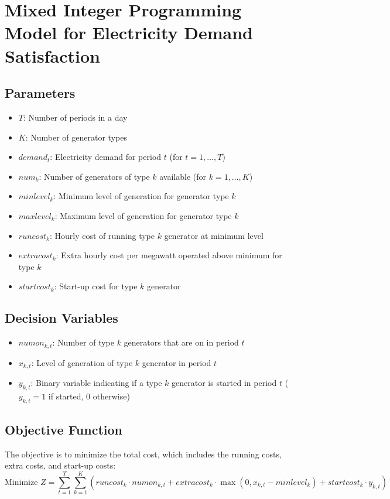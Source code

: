 \documentclass{article}
\begin{document}
\section*{Mixed Integer Programming Model for Electricity Demand Satisfaction}

\subsection*{Parameters}
\begin{itemize}
    \item $T$: Number of periods in a day
    \item $K$: Number of generator types
    \item $demand_{t}$: Electricity demand for period $t$ (for $t = 1, \ldots, T$)
    \item $num_{k}$: Number of generators of type $k$ available (for $k = 1, \ldots, K$)
    \item $minlevel_{k}$: Minimum level of generation for generator type $k$
    \item $maxlevel_{k}$: Maximum level of generation for generator type $k$
    \item $runcost_{k}$: Hourly cost of running type $k$ generator at minimum level
    \item $extracost_{k}$: Extra hourly cost per megawatt operated above minimum for type $k$
    \item $startcost_{k}$: Start-up cost for type $k$ generator
\end{itemize}

\subsection*{Decision Variables}
\begin{itemize}
    \item $numon_{k, t}$: Number of type $k$ generators that are on in period $t$
    \item $x_{k, t}$: Level of generation of type $k$ generator in period $t$
    \item $y_{k, t}$: Binary variable indicating if a type $k$ generator is started in period $t$ ($y_{k, t} = 1$ if started, 0 otherwise)
\end{itemize}

\subsection*{Objective Function}
The objective is to minimize the total cost, which includes the running costs, extra costs, and start-up costs:
\[
\text{Minimize } Z = \sum_{t=1}^{T} \sum_{k=1}^{K} \left( runcost_{k} \cdot numon_{k, t} + extracost_{k} \cdot \max(0, x_{k, t} - minlevel_{k}) + startcost_{k} \cdot y_{k, t} \right)
\]
\end{document}
